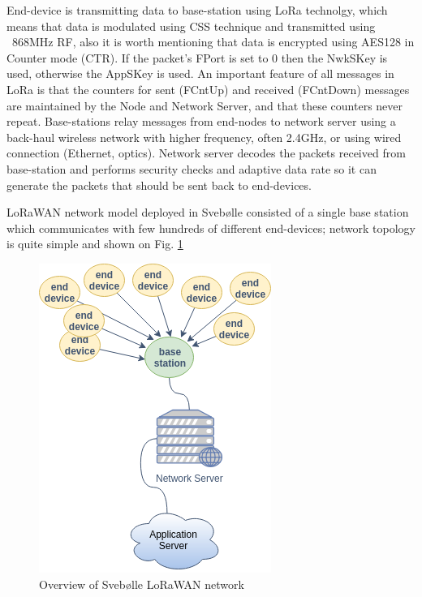 \documentclass[10pt, a4paper]{article} %
\begin{document}
End-device is transmitting data to base-station using LoRa technolgy, which means that data is modulated using CSS technique and transmitted using ~868MHz RF, also it is worth mentioning that data is encrypted using AES128 in Counter mode (CTR). If the packet’s FPort is set to 0 then the NwkSKey is used, otherwise the AppSKey is used. An important feature of all messages in LoRa is that the counters for sent (FCntUp) and received (FCntDown) messages are maintained by the Node and Network Server, and that these counters never repeat. \cite{Miller_LoRaSecurity}
Base-stations relay messages from end-nodes to network server using a back-haul wireless network with higher frequency, often 2.4GHz, or using wired connection (Ethernet, optics). 
Network server decodes the packets received from base-station and performs security checks and adaptive data rate so it can generate the packets that should be sent back to end-devices. \cite{Silva_LoRaWAN}

LoRaWAN network model deployed in Svebølle consisted of a single base station which communicates with few hundreds of different end-devices; network topology is quite simple and shown on Fig. \ref{svebolle}
\begin{figure}
	\centering
	\includegraphics[scale=.7]{images/Svebolle-Topology.png} %
	\caption{Overview of Svebølle LoRaWAN network} %
	\label{svebolle} 
\end{figure}
\end{document}
